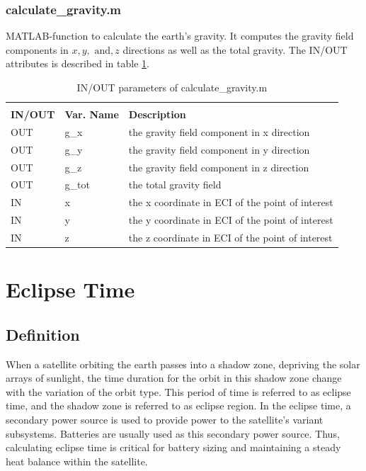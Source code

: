\subsubsection{calculate\_gravity.m}
MATLAB-function to calculate the earth's gravity. It computes the gravity field components in $x, y, \text{ and}, z$ directions as well as the total gravity. The IN/OUT attributes is described in table \ref{tab:grav}.
\begin{table}[H]
\centering
\caption{IN/OUT parameters of calculate\_gravity.m}
\label{tab:grav}
\begin{tabular}{lll}
\rowcolor[HTML]{000000} 
\multicolumn{3}{l}{\cellcolor[HTML]{000000}{\color[HTML]{FFFFFF} calculate\_gravity.m: Modeling the gravity field}}                                                \\
\rowcolor[HTML]{000000} 
{\color[HTML]{FFFFFF} \textbf{IN/OUT}} & {\color[HTML]{FFFFFF} \textbf{Var. Name}} & {\color[HTML]{FFFFFF} \textbf{Description}} \\
OUT & g\_x & the gravity field component in x direction\\
OUT & g\_y & the gravity field component in y direction\\
OUT & g\_z & the gravity field component in z direction\\
OUT & g_tot & the total gravity field\\
IN & x & the x coordinate in ECI of the point of interest \\
IN & y & the y coordinate in ECI of the point of interest\\
IN & z & the z coordinate in ECI of the point of interest
\end{tabular}%
\end{table}



\section{Eclipse Time}
\subsection{Definition}
When a satellite orbiting the earth passes into a shadow zone, depriving the solar arrays of sunlight, the time duration for the orbit in this shadow zone change with the variation of the orbit type. This period of time is referred to as eclipse time, and the shadow zone is referred to as eclipse region. In the eclipse time, a secondary power source is used to provide power to the satellite's variant subsystems. Batteries are usually used as this secondary power source. Thus, calculating eclipse time is critical for battery sizing and maintaining a steady heat balance within the satellite.


